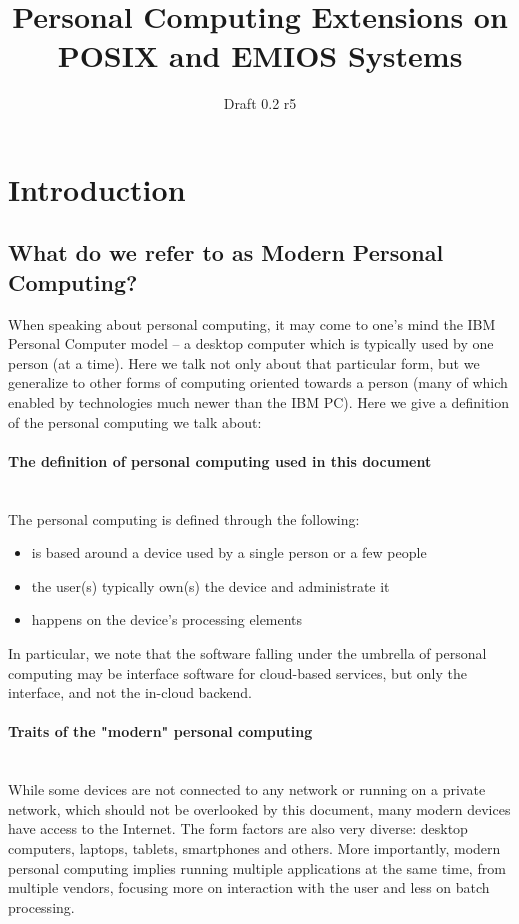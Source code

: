 \documentclass[a4paper,utf8,11pt]{article}
\title{Personal Computing Extensions on POSIX and EMIOS Systems}
\author{}
\date{Draft 0.2 r5}
\begin{document}
	\maketitle
	
	\clearpage
	\section{Introduction}
	\subsection{What do we refer to as Modern Personal Computing?}
	When speaking about personal computing, it may come to one's mind the IBM Personal Computer model -- a desktop computer which is typically used by one person (at a time). Here we talk not only about that particular form, but we generalize to other forms of computing oriented towards a person (many of which enabled by technologies much newer than the IBM PC). Here we give a definition of the personal computing we talk about:
	\paragraph{The definition of personal computing used in this document}\quad\\
	The personal computing is defined through the following:
	\begin{itemize}
		\item is based around a device used by a single person or a few people
		\item the user(s) typically own(s) the device and administrate it
		\item happens on the device's processing elements
	\end{itemize}
	In particular, we note that the software falling under the umbrella of personal computing may be interface software for cloud-based services, but only the interface, and not the in-cloud backend.
	\paragraph{Traits of the "modern" personal computing}\quad\\
	While some devices are not connected to any network or running on a private network, which should not be overlooked by this document, many modern devices have access to the Internet. The form factors are also very diverse: desktop computers, laptops, tablets, smartphones and others. More importantly, modern personal computing implies running multiple applications at the same time, from multiple vendors, focusing more on interaction with the user and less on batch processing.
\end{document}
